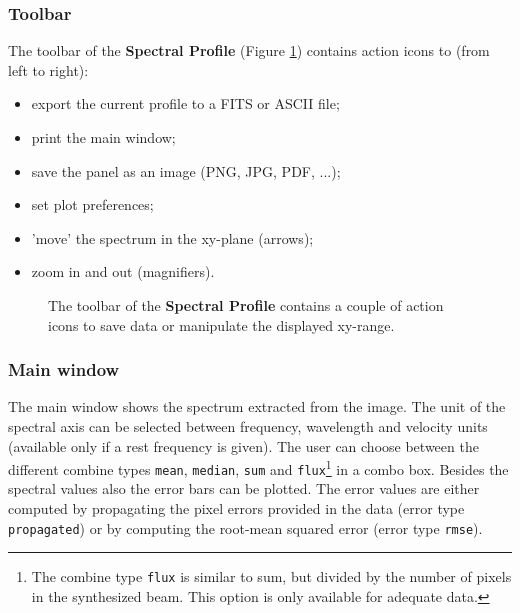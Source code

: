 \subsubsection{Toolbar}
\label{section:display.image.specprof.toolbar}
The toolbar of the {\bf Spectral Profile} (Figure \ref{fig:viewer_spectoolbar})
contains action icons to (from left to right):
\begin{itemize}
\item export the current profile to a FITS or ASCII file;
\item print the main window;
\item save the panel as an image (PNG, JPG, PDF, ...);
\item set plot preferences;
\item 'move' the spectrum in the xy-plane (arrows);
\item zoom in and out (magnifiers).
\end{itemize}

\begin{figure}[h!]
\begin{center}
\caption{\label{fig:viewer_spectoolbar}The toolbar of the
{\bf Spectral Profile} contains a couple of action icons to save data
or manipulate the displayed xy-range.}
\hrulefill
\end{center}
\end{figure}
\subsubsection{Main window}
\label{section:display.image.specprof.mainwindow}
The main window shows the spectrum extracted from the image. The unit of the
spectral axis can be selected between frequency, wavelength and velocity
units (available only if a rest frequency is given). The user can choose
between the different combine types {\tt mean}, {\tt median}, {\tt sum}
and {\tt flux}\footnote{The combine type {\tt flux} is similar to sum, but
divided by the number of pixels in the synthesized beam. This option is only available
for adequate data.}
in a combo box. Besides the spectral values also the error bars can be plotted.
The error values are either computed by propagating the pixel errors provided
in the data (error type {\tt propagated}) or by computing the
root-mean squared error (error type {\tt rmse}).

